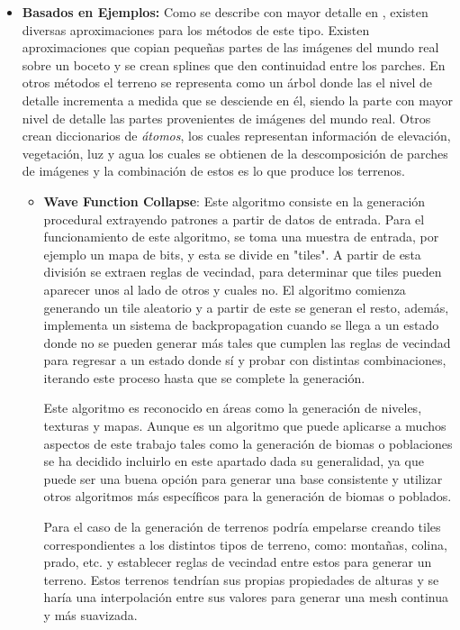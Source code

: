             \begin{itemize}
                \item \textbf{Basados en Ejemplos:} Como se describe con mayor detalle en \cite{Valencia-Rosado2019}, existen diversas aproximaciones para los métodos de este tipo. Existen aproximaciones que copian pequeñas partes de las imágenes del mundo real sobre un boceto y se crean splines que den continuidad entre los parches. En otros métodos el terreno se representa como un árbol donde las el nivel de detalle incrementa a medida que se desciende en él, siendo la parte con mayor nivel de detalle las partes provenientes de imágenes del mundo real. Otros crean diccionarios de \textit{átomos}, los cuales representan información de elevación, vegetación, luz y agua los cuales se obtienen de la descomposición de parches de imágenes y la combinación de estos es lo que produce los terrenos. 
                
                \begin{itemize}
                    \item \textbf{Wave Function Collapse}:  Este algoritmo consiste en la generación procedural extrayendo patrones a partir de datos de entrada. Para el funcionamiento de este algoritmo, se toma una muestra de entrada, por ejemplo un mapa de bits, y esta se divide en "tiles". A partir de esta división se extraen reglas de vecindad, para determinar que tiles pueden aparecer unos al lado de otros y cuales no. El algoritmo comienza generando un tile aleatorio y a partir de este se generan  el resto, además, implementa un sistema de backpropagation cuando se llega a un estado donde no se pueden generar más tales que cumplen las reglas de vecindad para regresar a un estado donde sí y probar con distintas combinaciones, iterando este proceso hasta que se complete la generación. \cite{mxgmn-WaveFunctionCollapse} \cite{procjam-WFC}

                    Este algoritmo es reconocido en áreas como la generación de niveles, texturas y mapas. Aunque es un algoritmo que puede aplicarse a muchos aspectos de este trabajo tales como la generación de biomas o poblaciones se ha decidido incluirlo en este apartado dada su generalidad, ya que puede ser una buena opción para generar una base consistente y utilizar otros algoritmos más específicos para la generación de biomas o poblados.

                    Para el caso de la generación de terrenos podría empelarse creando tiles correspondientes a los distintos tipos de terreno, como: montañas, colina, prado, etc. y establecer reglas de vecindad entre estos para generar un terreno. Estos terrenos tendrían sus propias propiedades de alturas y se haría una interpolación entre sus valores para generar una mesh continua y más suavizada.
            

\end{itemize}
\end{itemize}
